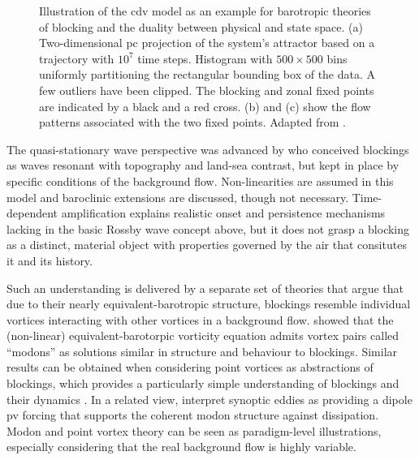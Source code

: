 \begin{figure}[thpb]
    \centering
    
    \caption{Illustration of the \gls{cdv} model as an example for barotropic
        theories of blocking and the duality between physical and state space.
        (a) Two-dimensional \gls{pc} projection of the system's attractor based on
        a trajectory with $10^7$ time steps. Histogram with
        $500 \times 500$ bins uniformly partitioning the rectangular bounding box of
        the data.  A few outliers have been clipped. The blocking and zonal
        fixed points are indicated by a black and a red cross. (b) and (c) show
        the flow patterns associated with the two fixed points.
        Adapted from \cite{dorringtonInteractionStochasticForcing2023}.}
    \label{fig:CdV_Schematic}
\end{figure}


The quasi-stationary wave perspective was advanced by
\textcite{tungTheoryStationaryLong1979} who conceived blockings as waves
resonant with topography and land-sea contrast, but kept in place by specific
conditions of the background flow. Non-linearities are assumed in this model
and baroclinic extensions are discussed, though not necessary. Time-dependent
amplification explains realistic onset and persistence mechanisms
lacking in the basic Rossby wave concept above, but it does not grasp a
blocking as a distinct, material object with properties governed by the air
that consitutes it and its history.

Such an understanding is delivered by a separate set of theories that argue
that due to their nearly equivalent-barotropic structure, blockings resemble
individual vortices interacting with other vortices in a background flow.
\textcite{mcwilliamsApplicationEquivalentModons1980} showed that the
(non-linear) equivalent-barotorpic vorticity equation admits vortex pairs
called \enquote{modons} as solutions similar in structure and behaviour to
blockings. Similar results can be obtained when considering point vortices as
abstractions of blockings, which provides a particularly simple
understanding of blockings and their dynamics
\parencite{mullerApplicationsPointVortex2015, hirtStatisticsDynamicsBlockings2018}. In a related view,
\textcite{hainesEddyForcedCoherentStructures1987} interpret synoptic eddies as
providing a dipole \gls{pv} forcing that supports the coherent modon structure
against dissipation. Modon and point vortex theory can be seen as
paradigm-level illustrations, especially considering that the real background
flow is highly variable.

